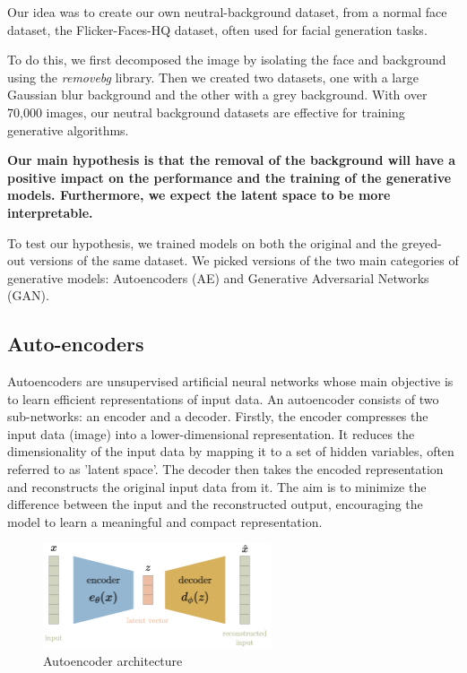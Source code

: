 \documentclass{article}
\begin{document}
\quad Our idea was to create our own neutral-background dataset, from a normal face dataset, the Flicker-Faces-HQ dataset, often used for facial generation tasks. 

To do this, we first decomposed the image by isolating the face and background using the \textit{removebg} library. 
Then we created two datasets, one with a large Gaussian blur background and the other with a grey background. 
With over 70,000 images, our neutral background datasets are effective for training generative algorithms.

\textbf{Our main hypothesis is that the removal of the background will have a positive impact on the performance and the training of the generative models. Furthermore, we expect the latent space to be more interpretable.}

To test our hypothesis, we trained models on both the original and the greyed-out versions of the same dataset. 
We picked versions of the two main categories of generative models: Autoencoders (AE) and Generative Adversarial Networks (GAN).

\subsection{Auto-encoders}

\quad Autoencoders are unsupervised artificial neural networks whose main objective is to learn efficient representations of input data. 
An autoencoder consists of two sub-networks: an encoder and a decoder. 
Firstly, the encoder compresses the input data (image) into a lower-dimensional representation. 
It reduces the dimensionality of the input data by mapping it to a set of hidden variables, often referred to as 'latent space'. 
The decoder then takes the encoded representation and reconstructs the original input data from it. 
The aim is to minimize the difference between the input and the reconstructed output, encouraging the model to learn a meaningful and compact representation.

\begin{figure}[H]
    \centering
    \includegraphics[width=0.6\textwidth]{images/ae.png}
    \caption{Autoencoder architecture}
\end{figure}
\end{document}
